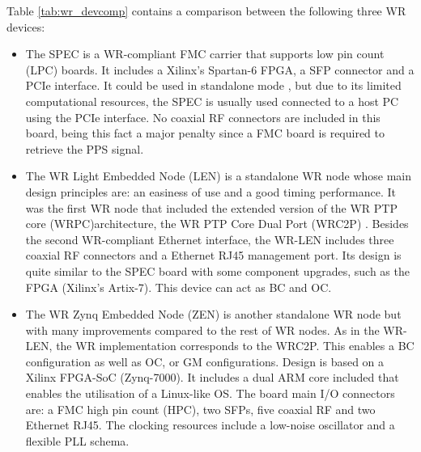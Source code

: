 Table \ref{tab:wr_devcomp} contains a comparison between the following three WR
devices: 

\begin{itemize} 
	\item The SPEC \cite{ohwr:spec} is a WR-compliant FMC carrier that supports low pin count (LPC) boards. It includes a Xilinx's Spartan-6 FPGA, a SFP connector and a PCIe interface. It could be used in standalone mode \cite{migueljl-paper-wr-spec}, but due to its limited computational resources, the SPEC is usually used connected to a host PC using the PCIe interface.  No coaxial RF connectors are included in this board, being this fact a major penalty since a FMC board is required to retrieve the PPS signal.
	
	\item The WR Light Embedded Node (LEN) \cite{sevensols:wr_len} is a 	standalone WR node whose main design principles are: an easiness of use and a good timing performance. It was the first WR node	that included the extended version of the WR PTP core (WRPC)architecture, the WR PTP Core Dual Port (WRC2P) \cite{torres2016scalability}. Besides the second WR-compliant Ethernet interface, the WR-LEN includes three coaxial RF
	connectors and a Ethernet RJ45 management port. Its design is quite similar to the SPEC board with some component upgrades, such as the FPGA (Xilinx's Artix-7). This device can act as BC and OC.
	
	\item The WR Zynq Embedded Node (ZEN) \cite{sevensols:wr_zen} is another
	standalone WR node but with many improvements compared to the rest of WR nodes. As in the WR-LEN, the WR implementation corresponds to the WRC2P.  This enables a BC configuration as well as OC, or GM configurations. Design is based on a Xilinx FPGA-SoC (Zynq-7000). It includes a dual ARM core included that enables the utilisation of a Linux-like	OS. The board main I/O connectors are: a FMC high pin count (HPC), two SFPs, five coaxial RF and two Ethernet RJ45. The clocking resources include a low-noise oscillator and a flexible PLL schema.
\end{itemize}

